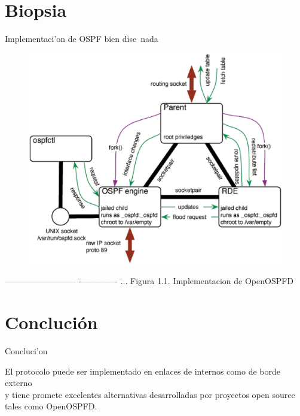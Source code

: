 \documentclass[xcolor=dvipsnames]{beamer}
\begin{document}
\section{Biopsia}
	\begin{frame}{Implementaci'on de OSPF bien dise~nada}
	\scriptsize
	{
	\begin{figure}
	\centering 
		\includegraphics[scale=0.32]{ospfd_implementation.eps}
	\end{figure}
	\begin{tabbing}
		-------------------------- \= -------------- \= ... \kill
		\> Figura 1.1. Implementacion de OpenOSPFD
	\end{tabbing}
	}
	\end{frame}
	
\section{Concluci\'on}	
	\begin{frame}{Concluci'on}
	\scriptsize
	{
	\begin{tabbing}	
		El protocolo puede ser implementado en enlaces de internos como de borde externo \\
		y tiene promete excelentes alternativas desarrolladas por proyectos open source \\
		tales como OpenOSPFD.
	\end{tabbing}
	}
	\end{frame}
\end{document}
